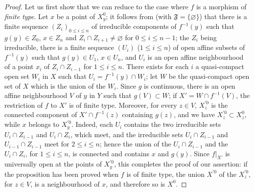 \begin{proof}
Let us first show that we can reduce to the case where $f$ is a morphism of \emph{finite type}.
Let $x$ be a point of $X_y^0$; it follows from  (with $\mathfrak{F}=\{\varnothing\}$) that there is a finite sequence $(Z_i)_{0\leq i\leq n}$ of irreducible components of $f^{-1}(y)$ such that $g(y)\in Z_0$, $x\in Z_n$ and $Z_i\cap Z_{i+1}\neq\varnothing$ for $0\leq i\leq n-1$; the $Z_i$ being irreducible, there is a finite sequence $(U_i)$ ($1\leq i\leq n$) of open affine subsets of $f^{-1}(y)$ such that $g(y)\in U_1$, $x\in U_n$, and $U_i$ is an open affine neighbourhood of a point $x_i$ of $Z_i\cap Z_{i-1}$ for $1\leq i\leq n$.
There exists for each $i$ a quasi-compact open set $W_i$ in $X$ such that $U_i=f^{-1}(y)\cap W_i$; let $W$ be the quasi-compact open set of $X$ which is the union of the $W_i$.
Since $g$ is continuous, there is an open affine neighbourhood $V$ of $y$ in $Y$ such that $g(V)\subset W$; if $X'=W\cap f^{-1}(V)$, the restriction of $f$ to $X'$ is of finite type. Moreover, for every $z\in V$, $X_z^{\prime 0}$ is the connected component of $X'\cap f^{-1}(z)$ containing $g(z)$, and we have $X_z^{\prime 0}\subset X_z^0$, while $x$ belongs to $X_y^{\prime 0}$.
Indeed, each $U_i$ contains the two irreducible sets $U_i\cap Z_{i-1}$ and $U_i\cap Z_i$, which meet, and the irreducible sets $U_i\cap Z_{i-1}$ and $U_{i-1}\cap Z_{i-1}$
meet for $2\leq i\leq n$; hence the union of the $U_i\cap Z_{i-1}$ and the $U_i\cap Z_i$, for $1\leq i\leq n$, is connected and contains $x$ and $g(y)$.
Since $f|_{X'}$ is universally open at the points of $X_y^{\prime 0}$, this completes the proof of our assertion: if the proposition has been proved when $f$ is of finite type, the union $X^{\prime 0}$ of the $X_z^{\prime 0}$, for $z\in V$, is a neighbourhood of $x$, and therefore so is $X^0$.


\end{proof}
